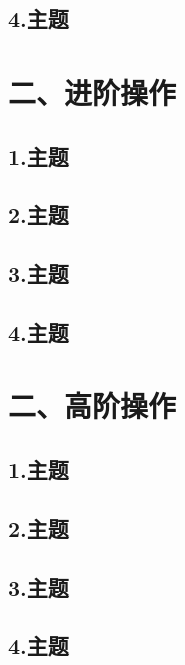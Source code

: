 \documentclass[12pt,aspectratio=169,mathserif]{beamer}
\begin{document}
\subsection{4.主题}

\section{二、进阶操作}
\subsection{1.主题}
\subsection{2.主题}
\subsection{3.主题}
\subsection{4.主题}

\section{二、高阶操作}
\subsection{1.主题}
\subsection{2.主题}
\subsection{3.主题}
\subsection{4.主题}
\end{document}
